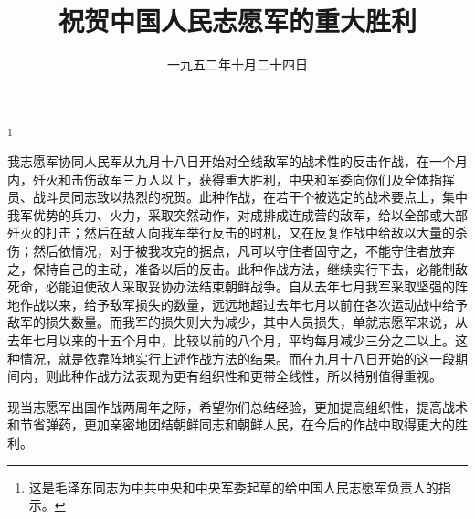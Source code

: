 
\title{祝贺中国人民志愿军的重大胜利}
\date{一九五二年十月二十四日}
\thanks{这是毛泽东同志为中共中央和中央军委起草的给中国人民志愿军负责人的指示。}
\maketitle


我志愿军协同人民军从九月十八日开始对全线敌军的战术性的反击作战，在一个月内，歼灭和击伤敌军三万人以上，获得重大胜利，中央和军委向你们及全体指挥员、战斗员同志致以热烈的祝贺。此种作战，在若干个被选定的战术要点上，集中我军优势的兵力、火力，采取突然动作，对成排成连成营的敌军，给以全部或大部歼灭的打击；然后在敌人向我军举行反击的时机，又在反复作战中给敌以大量的杀伤；然后依情况，对于被我攻克的据点，凡可以守住者固守之，不能守住者放弃之，保持自己的主动，准备以后的反击。此种作战方法，继续实行下去，必能制敌死命，必能迫使敌人采取妥协办法结束朝鲜战争。自从去年七月我军采取坚强的阵地作战以来，给予敌军损失的数量，远远地超过去年七月以前在各次运动战中给予敌军的损失数量。而我军的损失则大为减少，其中人员损失，单就志愿军来说，从去年七月以来的十五个月中，比较以前的八个月，平均每月减少三分之二以上。这种情况，就是依靠阵地实行上述作战方法的结果。而在九月十八日开始的这一段期间内，则此种作战方法表现为更有组织性和更带全线性，所以特别值得重视。

现当志愿军出国作战两周年之际，希望你们总结经验，更加提高组织性，提高战术和节省弹药，更加亲密地团结朝鲜同志和朝鲜人民，在今后的作战中取得更大的胜利。

